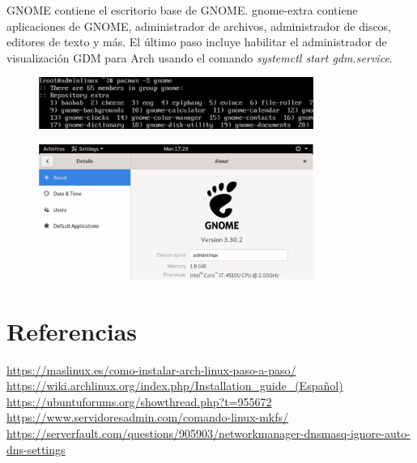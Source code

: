 \documentclass[11pt,letterpaper]{article}
\begin{document}
GNOME contiene el escritorio base de GNOME. gnome-extra contiene aplicaciones de GNOME, administrador de archivos, administrador de discos, editores de texto y más. El último paso incluye habilitar el administrador de visualización GDM para Arch usando el comando \textit{systemctl start gdm.service}.


\begin{figure}[H]
        \centering
        \includegraphics[width=0.8\textwidth]{img/34.png}
        \label{img:Imagen 4}
\end{figure}


\begin{figure}[H]
        \centering
        \includegraphics[width=0.8\textwidth]{img/35.png}
        \label{img:Imagen 4}
\end{figure}

\section{Referencias}
\begin{thebibliography}{}
\url{https://maslinux.es/como-instalar-arch-linux-paso-a-paso/}
\url{https://wiki.archlinux.org/index.php/Installation_guide_(Español)}
\url{https://ubuntuforums.org/showthread.php?t=955672}
\url{https://www.servidoresadmin.com/comando-linux-mkfs/}
\url{https://serverfault.com/questions/905903/networkmanager-dnsmasq-ignore-auto-dns-settings}
\end{thebibliography}
\end{document}
